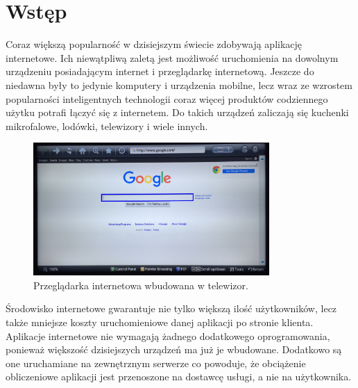 {\let\cleardoublepage\relax \chapter{Wstęp}}
\label{cha:wstep}





Coraz większą popularność w dzisiejszym świecie zdobywają aplikację internetowe. Ich niewątpliwą zaletą jest możliwość uruchomienia na dowolnym urządzeniu posiadającym internet i przeglądarkę internetową. Jeszcze do niedawna były to jedynie komputery i urządzenia mobilne, lecz wraz ze wzrostem popularności inteligentnych technologii coraz więcej produktów codziennego użytku potrafi łączyć się z internetem. Do takich urządzeń zaliczają się kuchenki mikrofalowe, lodówki, telewizory i wiele innych.

\begin{figure}[h]
	\centering
	\includegraphics[height=50.5mm]{images/Browser.jpg}
	 \caption{Przeglądarka internetowa wbudowana w telewizor.}
\end{figure}


Środowisko internetowe gwarantuje nie tylko większą ilość użytkowników, lecz także mniejsze koszty uruchomieniowe danej aplikacji po stronie klienta. Aplikacje internetowe nie wymagają żadnego dodatkowego oprogramowania, ponieważ większość dzisiejszych urządzeń ma już je wbudowane. Dodatkowo są one uruchamiane na zewnętrznym serwerze co powoduje, że obciążenie obliczeniowe aplikacji jest przenoszone na dostawcę usługi, a nie na użytkownika. 


